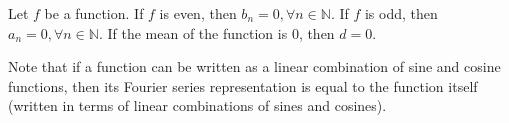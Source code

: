 \documentclass[12pt]{article}
\begin{document}
\begin{proposition}
    Let $f$ be a function. If $f$ is even, then $b_n = 0, \forall n \in \mathbb{N}$. If $f$ is odd, then $a_n = 0, \forall n \in \mathbb{N}$. If the mean of the function is $0$, then $d = 0$.
\end{proposition}

Note that if a function can be written as a linear combination of sine and cosine functions, then its Fourier series representation is equal to the function itself (written in terms of linear combinations of sines and cosines).
\end{document}
